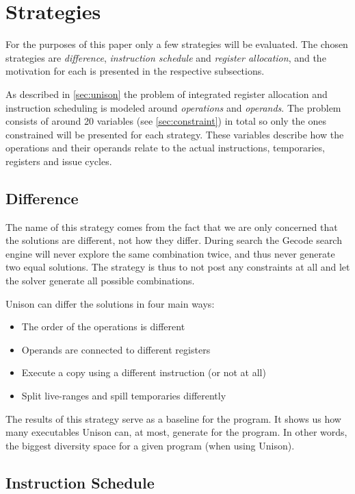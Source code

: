 \section{Strategies}

For the purposes of this paper only a few strategies will be evaluated. The chosen
strategies are \textit{difference}, \textit{instruction schedule} and
\textit{register allocation}, and the motivation for each is presented in the respective
subsections.

As described in \ref{sec:unison} the problem of integrated register allocation and
instruction scheduling is modeled around \textit{operations} and \textit{operands}. The
problem consists of around 20 variables (see \ref{sec:constraint}) in total so only the
ones constrained will be presented for each strategy. These variables describe how the
operations and their operands relate to the actual instructions, temporaries, registers
and issue cycles.

\subsection{Difference}

The name of this strategy comes from the fact that we are only concerned that the solutions
are different, not how they differ. During search the Gecode search engine will never
explore the same combination twice, and thus never generate two equal solutions. The
strategy is thus to not post any constraints at all and let the solver generate all
possible combinations.

Unison can differ the solutions in four main ways:

\begin{itemize}
	\item The order of the operations is different
	\item Operands are connected to different registers
	\item Execute a copy using a different instruction (or not at all)
	\item Split live-ranges and spill temporaries differently
\end{itemize}

The results of this strategy serve as a baseline for the program. It shows us how many
executables Unison can, at most, generate for the program. In other words, the biggest
diversity space for a given program (when using Unison).

\subsection{Instruction Schedule}

